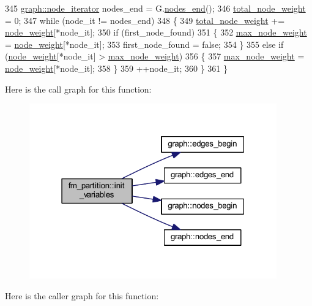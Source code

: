 \begin{DoxyCode}
345     \mbox{\hyperlink{classgraph_a2cb374b84c133ce13f94e73c3e5da7fa}{graph::node\_iterator}} nodes\_end = G.\mbox{\hyperlink{classgraph_abbf9c0cb5629e98e1142254911238173}{nodes\_end}}();
346     \mbox{\hyperlink{classfm__partition_a25651e3f78ddbc418ea978ca6b28e0e0}{total\_node\_weight}} = 0;
347     \textcolor{keywordflow}{while} (node\_it != nodes\_end)
348     \{
349     \mbox{\hyperlink{classfm__partition_a25651e3f78ddbc418ea978ca6b28e0e0}{total\_node\_weight}} += \mbox{\hyperlink{classfm__partition_ae1ba643b4bd6721075ab7b608bcf3cd6}{node\_weight}}[*node\_it];
350     \textcolor{keywordflow}{if} (first\_node\_found)
351     \{
352         \mbox{\hyperlink{classfm__partition_a8591f5eddac01679e1da3d835eae1cf6}{max\_node\_weight}} = \mbox{\hyperlink{classfm__partition_ae1ba643b4bd6721075ab7b608bcf3cd6}{node\_weight}}[*node\_it];
353         first\_node\_found = \textcolor{keyword}{false};
354     \}
355     \textcolor{keywordflow}{else} \textcolor{keywordflow}{if} (\mbox{\hyperlink{classfm__partition_ae1ba643b4bd6721075ab7b608bcf3cd6}{node\_weight}}[*node\_it] > \mbox{\hyperlink{classfm__partition_a8591f5eddac01679e1da3d835eae1cf6}{max\_node\_weight}})
356     \{
357         \mbox{\hyperlink{classfm__partition_a8591f5eddac01679e1da3d835eae1cf6}{max\_node\_weight}} = \mbox{\hyperlink{classfm__partition_ae1ba643b4bd6721075ab7b608bcf3cd6}{node\_weight}}[*node\_it];
358     \}
359     ++node\_it;
360     \}
361 \}
\end{DoxyCode}
Here is the call graph for this function\+:\nopagebreak
\begin{figure}[H]
\begin{center}
\leavevmode
\includegraphics[width=303pt]{classfm__partition_aad791ac648a9ff4694c8960f49dcc018_cgraph}
\end{center}
\end{figure}
Here is the caller graph for this function\+:\nopagebreak
